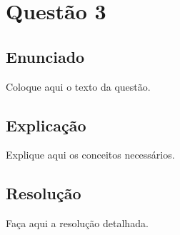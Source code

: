 \section{Questão 3}

\subsection{Enunciado}

Coloque aqui o texto da questão.

\vspace{0.5cm}

\subsection{Explicação}

Explique aqui os conceitos necessários.

\vspace{0.5cm}

\subsection{Resolução}

Faça aqui a resolução detalhada.